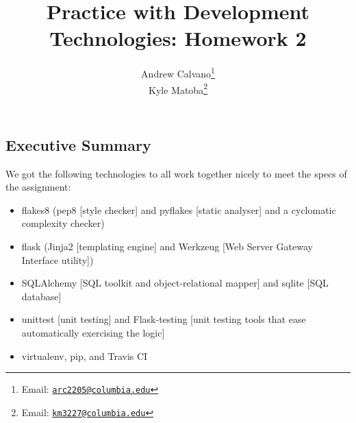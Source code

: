 \documentclass[10pt]{article}
\theoremstyle{remark}
\numberwithin{equation}{section}
\begin{document}
\title{Practice with Development Technologies: Homework 2 }

\author{
Andrew Calvano\thanks{Email: \href{mailto:arc2205@columbia.edu}{\texttt{arc2205@columbia.edu}}} \\ 
Kyle Matoba\thanks{Email: \href{mailto:km3227@columbia.edu}{\texttt{km3227@columbia.edu}}}
}
\date{}
\maketitle




\section{} 

\subsection{Executive Summary}

We got the following technologies to all work together nicely to meet the specs of the assignment:

\begin{itemize} 
\item flakes8 (pep8 [style checker] and pyflakes [static analyser] and a cyclomatic complexity checker)
\item flask (Jinja2 [templating engine] and Werkzeug [Web Server Gateway Interface utility])
\item SQLAlchemy [SQL toolkit and object-relational mapper] and sqlite [SQL database]
\item unittest [unit testing] and Flask-testing [unit testing tools that ease automatically exercising the logic]
\item virtualenv, pip, and Travis CI
\end{itemize} 
\end{document}
